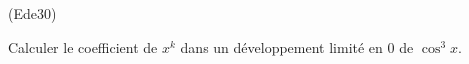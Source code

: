 \begin{tiny}(Ede30)\end{tiny} Calculer le coefficient de $x^{k}$ dans un développement limité en $0$ de $\cos^3 x$.